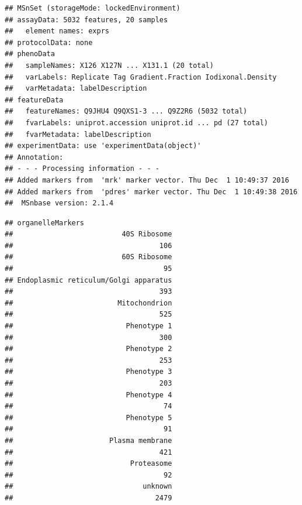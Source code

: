 \begin{knitrout}
\color{fgcolor}\begin{kframe}
\begin{alltt}
\end{alltt}
\begin{verbatim}
## MSnSet (storageMode: lockedEnvironment)
## assayData: 5032 features, 20 samples 
##   element names: exprs 
## protocolData: none
## phenoData
##   sampleNames: X126 X127N ... X131.1 (20 total)
##   varLabels: Replicate Tag Gradient.Fraction Iodixonal.Density
##   varMetadata: labelDescription
## featureData
##   featureNames: Q9JHU4 Q9QXS1-3 ... Q9Z2R6 (5032 total)
##   fvarLabels: uniprot.accession uniprot.id ... pd (27 total)
##   fvarMetadata: labelDescription
## experimentData: use 'experimentData(object)'
## Annotation:  
## - - - Processing information - - -
## Added markers from  'mrk' marker vector. Thu Dec  1 10:49:37 2016 
## Added markers from  'pdres' marker vector. Thu Dec  1 10:49:38 2016 
##  MSnbase version: 2.1.4
\end{verbatim}
\begin{alltt}
  \hlstd{=} \hlstd{)}
\end{alltt}
\begin{verbatim}
## organelleMarkers
##                          40S Ribosome 
##                                   106 
##                          60S Ribosome 
##                                    95 
## Endoplasmic reticulum/Golgi apparatus 
##                                   393 
##                         Mitochondrion 
##                                   525 
##                           Phenotype 1 
##                                   300 
##                           Phenotype 2 
##                                   253 
##                           Phenotype 3 
##                                   203 
##                           Phenotype 4 
##                                    74 
##                           Phenotype 5 
##                                    91 
##                       Plasma membrane 
##                                   421 
##                            Proteasome 
##                                    92 
##                               unknown 
##                                  2479
\end{verbatim}
\end{kframe}
\end{knitrout}


